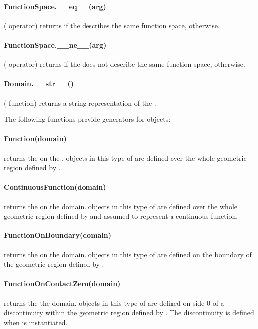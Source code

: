 %
\paragraph{FunctionSpace.__eq__(arg)}
(\PYTHON \var{==} operator) returns \True if the \FunctionSpace {}
    describes the same function space, \False otherwise.

%
\paragraph{FunctionSpace.__ne__(arg)}
(\PYTHON \var{!=} operator) returns \True if the \FunctionSpace {}
    does not describe the same function space, \False otherwise.


\paragraph{Domain.__str__()}
(\PYTHON {} function) returns a string representation of the
    \FunctionSpace.


\noindent The following functions provide generators for \FunctionSpace objects:

\paragraph{Function(domain)}
returns the \Function on the \Domain {}. \Data objects in this
    type of \Function are defined over the whole geometric region defined by
    .

%
\paragraph{ContinuousFunction(domain)}
returns the \ContinuousFunction on the \Domain domain. \Data objects in
    this type of \Function are defined over the whole geometric region defined
    by  and assumed to represent a continuous function.

%
\paragraph{FunctionOnBoundary(domain)}
returns the \FunctionOnBoundary on the \Domain domain. \Data objects in
    this type of \Function are defined on the boundary of the geometric region
    defined by .

%
\paragraph{FunctionOnContactZero(domain)}
returns the \FunctionOnContactZero the \Domain domain. \Data objects in
    this type of \Function are defined on side 0 of a discontinuity  within
    the geometric region defined by .
    The discontinuity is defined when  is instantiated.

